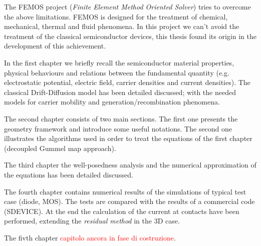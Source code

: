 The FEMOS project (\textit{Finite Element Method Oriented Solver}) tries to overcome the above limitations. FEMOS is designed for the treatment of chemical, mechanical, thermal and fluid phenomena. 
In this project we can't avoid the treatment of the classical semiconductor devices, this thesis found its origin in the development of this achievement.

In the first chapter we briefly recall the semiconductor material properties, physical behaviours and relations between the fundamental quantity (e.g. electrostatic potential, electric field, carrier densities and current densities). The classical Drift-Diffusion model has been detailed discussed; with the needed models for carrier mobility and generation/recombination phenomena.

The second chapter consists of two main sections. The first one presents the geometry framework and introduce some useful notations. The second one illustrates the algorithms used in order to treat the equations of the first chapter (decoupled Gummel map approach).

The third chapter the well-posedness analysis and the numerical approximation of the equations has been detailed discussed.

The fourth chapter contains numerical results of the simulations of typical test case (diode, MOS). The tests are compared with the results of a commercial code (SDEVICE). At the end the calculation of the current at contacts have been performed, extending the \textit{residual method} \cite{ContactCurrentRM} in the 3D case.

The fivth chapter \textcolor{red}{capitolo ancora in fase di costruzione}.


